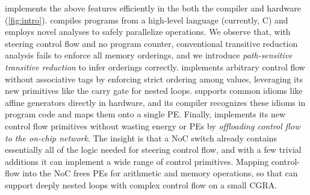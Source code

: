 \riptide implements the above features efficiently in the both
the compiler and hardware (\autoref{fig:intro}).
%
\riptide compiles programs from a high-level language (currently, C) and
employs novel analyses to safely parallelize operations.
%
We observe that, with steering control flow and no program counter,
conventional transitive reduction analysis fails to enforce all memory
orderings, and we introduce \emph{path-sensitive transitive reduction}
to infer orderings correctly.
%
\riptide implements arbitrary control flow without associative tags
by enforcing strict ordering among values,
leveraging its new primitives like the carry gate for nested loops.
%
\riptide supports common idioms like affine generators directly in hardware,
%
and its compiler recognizes these idioms in program code
and maps them onto a single PE.
%
Finally, \riptide implements its new control flow primitives without wasting energy
or PEs by \emph{offloading control flow to the on-chip network}.
%
The insight is that a NoC switch already contains essentially all of
the logic needed for steering control flow, and with a few
trivial additions it can implement a wide range of control primitives.
%
Mapping control-flow into the NoC frees PEs for arithmetic and memory
operations, so that \riptide can support deeply nested loops with complex
control flow on a small CGRA.
%

